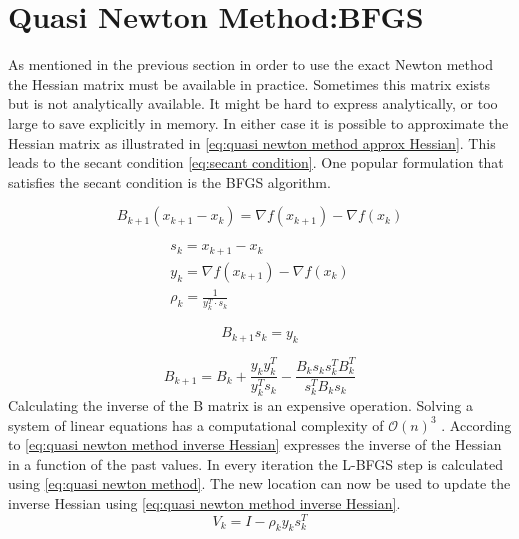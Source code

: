 	\section{Quasi Newton Method:BFGS}
	As mentioned in the previous section in order to use the exact Newton method the Hessian matrix must be available in practice. Sometimes this matrix exists but is not analytically available. It might be hard to express analytically, or too large to save explicitly in memory. In either case it is possible to approximate the Hessian matrix as illustrated in \eqref{eq:quasi newton method approx Hessian}.  This leads to the secant condition \eqref{eq:secant condition}. One popular formulation that satisfies the secant condition is the BFGS algorithm.
		
		\begin{equation}
			B_{k+1}(x_{k+1}-x_k) = \nabla f(x_{k+1}) - \nabla f(x_k)
			\label{eq:quasi newton method approx Hessian}	
		\end{equation}
		
		\begin{eqnarray}
			s_k = x_{k+1} - x_{k} \\
			y_k = \nabla f(x_{k+1}) - \nabla f(x_{k}) \\
			\rho_k = \frac{1}{y_k^T \cdot s_k}
		\end{eqnarray}
	
		
		\begin{equation}
			B_{k+1} s_{k} = y_{k}
			\label{eq:secant condition}
		\end{equation}
		
		\begin{equation}
			B_{k+1} = B_{k} + \frac{y_k y_k^T}{ y_k^T s_k} - \frac{B_k s_k s_k^T B_k^T}{s_k^TB_ks_k}
			\label{eq:quasi newton method approx Hessian with past values}
		\end{equation}
	Calculating the inverse of the B matrix is an expensive operation. Solving a system of linear equations has a computational complexity of $\mathcal{O}(n)^3$ . According to \cite{Wright} \eqref{eq:quasi newton method inverse Hessian} expresses the inverse of the Hessian in a function of the past values. In every iteration the L-BFGS step is calculated using \eqref{eq:quasi newton method}. The new location can now be used to update the inverse Hessian using \eqref{eq:quasi newton method inverse Hessian}.
		\begin{equation}
			V_k = I - \rho_ky_ks_k^T
		\end{equation}
	
